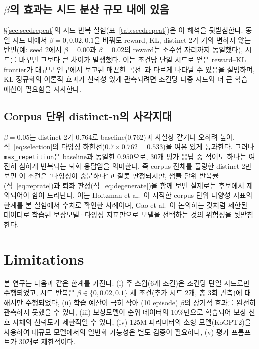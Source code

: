 \documentclass[conference]{IEEEtran}
\begin{document}
\subsection{$\beta$의 효과는 시드 분산 규모 내에 있음}

\S\ref{sec:seedrepeat}의 시드 반복 실험(표~\ref{tab:seedrepeat})은 이 해석을
뒷받침한다. 동일 시드 내에서 $\beta{=}0, 0.02, 0.1$을 바꿔도 reward, KL,
distinct-2가 거의 변하지 않는 반면(예: seed 2에서 $\beta{=}0.00$과
$\beta{=}0.02$의 reward는 소수점 자리까지 동일했다), 시드를 바꾸면 그보다
큰 차이가 발생했다. 이는 조건당 단일 시드로 얻은 reward--KL frontier가
대규모 연구에서 보고된 매끈한 곡선~\cite{ziegler2019finetuning,
stiennon2020learning}과 다르게 나타날 수 있음을 설명하며, KL 정규화의
이론적 효과가 신뢰성 있게 관측되려면 조건당 다중 시드와 더 큰 학습
예산이 필요함을 시사한다.

\subsection{Corpus 단위 distinct-n의 사각지대}

$\beta{=}0.05$는 distinct-2가 $0.764$로 baseline(0.762)과 사실상 같거나
오히려 높아, 식~\eqref{eq:selection}의 다양성 하한선($0.7\times 0.762 =
0.533$)을 여유 있게 통과한다. 그러나 \texttt{max\_repetition}은
baseline과 동일한 $0.950$으로, 30개 평가 응답 중 적어도 하나는 여전히
심하게 반복되는 퇴화 응답임을 의미한다. 즉 corpus 전체를 풀링한
distinct-2만 보면 이 조건은 "다양성이 충분하다"고 잘못 판정되지만,
샘플 단위 반복률(식~\eqref{eq:reprate})과 퇴화 판정(식~\eqref{eq:degenerate})을
함께 보면 실제로는 후보에서 제외되어야 함이 드러난다. 이는 Holtzman et
al.~\cite{holtzman2020curious}이 지적한 corpus 단위 다양성 지표의 한계를
본 실험에서 수치로 확인한 사례이며, Gao et al.~\cite{gao2023scaling}이
논의하는 것처럼 제한된 데이터로 학습된 보상모델·다양성 지표만으로 모델을
선택하는 것의 위험성을 뒷받침한다.

\section{Limitations}

본 연구는 다음과 같은 한계를 가진다: (i) 주 스윕(6개 조건)은 조건당 단일
시드로만 수행되었고, 시드 반복은 $\beta \in \{0, 0.02, 0.1\}$ 세 조건(추가
시드 2개, 총 3회 관측)에 대해서만 수행되었다, (ii) 학습 예산이 극히 작아
(10 episode) $\beta$의 장기적 효과를 완전히 관측하지 못했을 수 있다,
(iii) 보상모델이 순위 데이터의 10\%만으로 학습되어 보상 신호 자체의
신뢰도가 제한적일 수 있다, (iv) 125M 파라미터의 소형 모델(KoGPT2)을
사용하여 대규모 모델에서의 일반화 가능성은 별도 검증이 필요하다, (v)
평가 프롬프트가 30개로 제한적이다.
\end{document}

